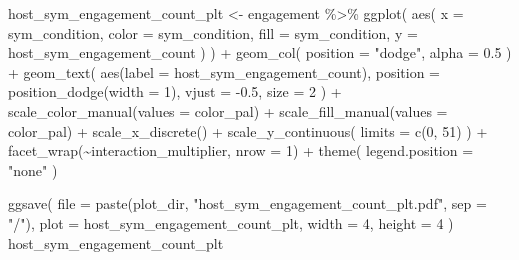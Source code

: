 \documentclass[
]{book}
\newenvironment{Shaded}{\begin{snugshade}}{\end{snugshade}}
\newcommand{\AttributeTok}[1]{\textcolor[rgb]{0.77,0.63,0.00}{#1}}
\newcommand{\DecValTok}[1]{\textcolor[rgb]{0.00,0.00,0.81}{#1}}
\newcommand{\FloatTok}[1]{\textcolor[rgb]{0.00,0.00,0.81}{#1}}
\newcommand{\FunctionTok}[1]{\textcolor[rgb]{0.00,0.00,0.00}{#1}}
\newcommand{\NormalTok}[1]{#1}
\newcommand{\OtherTok}[1]{\textcolor[rgb]{0.56,0.35,0.01}{#1}}
\newcommand{\SpecialCharTok}[1]{\textcolor[rgb]{0.00,0.00,0.00}{#1}}
\newcommand{\StringTok}[1]{\textcolor[rgb]{0.31,0.60,0.02}{#1}}
\begin{document}
\begin{Shaded}
\begin{Highlighting}[]
\NormalTok{host\_sym\_engagement\_count\_plt }\OtherTok{\textless{}{-}}\NormalTok{ engagement }\SpecialCharTok{\%\textgreater{}\%}
  \FunctionTok{ggplot}\NormalTok{(}
    \FunctionTok{aes}\NormalTok{(}
      \AttributeTok{x =}\NormalTok{ sym\_condition,}
      \AttributeTok{color =}\NormalTok{ sym\_condition,}
      \AttributeTok{fill =}\NormalTok{ sym\_condition,}
      \AttributeTok{y =}\NormalTok{ host\_sym\_engagement\_count}
\NormalTok{    )}
\NormalTok{  ) }\SpecialCharTok{+}
  \FunctionTok{geom\_col}\NormalTok{(}
    \AttributeTok{position =} \StringTok{"dodge"}\NormalTok{,}
    \AttributeTok{alpha =} \FloatTok{0.5}
\NormalTok{  ) }\SpecialCharTok{+}
  \FunctionTok{geom\_text}\NormalTok{(}
    \FunctionTok{aes}\NormalTok{(}\AttributeTok{label =}\NormalTok{ host\_sym\_engagement\_count),}
    \AttributeTok{position =} \FunctionTok{position\_dodge}\NormalTok{(}\AttributeTok{width =} \DecValTok{1}\NormalTok{),}
    \AttributeTok{vjust =} \SpecialCharTok{{-}}\FloatTok{0.5}\NormalTok{,}
    \AttributeTok{size =} \DecValTok{2}
\NormalTok{  ) }\SpecialCharTok{+}
  \FunctionTok{scale\_color\_manual}\NormalTok{(}\AttributeTok{values =}\NormalTok{ color\_pal) }\SpecialCharTok{+}
  \FunctionTok{scale\_fill\_manual}\NormalTok{(}\AttributeTok{values =}\NormalTok{ color\_pal) }\SpecialCharTok{+}
  \FunctionTok{scale\_x\_discrete}\NormalTok{() }\SpecialCharTok{+}
  \FunctionTok{scale\_y\_continuous}\NormalTok{(}
    \AttributeTok{limits =} \FunctionTok{c}\NormalTok{(}\DecValTok{0}\NormalTok{, }\DecValTok{51}\NormalTok{)}
\NormalTok{  ) }\SpecialCharTok{+}
  \FunctionTok{facet\_wrap}\NormalTok{(}\SpecialCharTok{\textasciitilde{}}\NormalTok{interaction\_multiplier, }\AttributeTok{nrow =} \DecValTok{1}\NormalTok{) }\SpecialCharTok{+}
  \FunctionTok{theme}\NormalTok{(}
    \AttributeTok{legend.position =} \StringTok{"none"}
\NormalTok{  )}

\FunctionTok{ggsave}\NormalTok{(}
  \AttributeTok{file =} \FunctionTok{paste}\NormalTok{(plot\_dir, }\StringTok{"host\_sym\_engagement\_count\_plt.pdf"}\NormalTok{, }\AttributeTok{sep =} \StringTok{"/"}\NormalTok{),}
  \AttributeTok{plot =}\NormalTok{ host\_sym\_engagement\_count\_plt,}
  \AttributeTok{width =} \DecValTok{4}\NormalTok{,}
  \AttributeTok{height =} \DecValTok{4}
\NormalTok{)}
\NormalTok{host\_sym\_engagement\_count\_plt}
\end{Highlighting}
\end{Shaded}
\end{document}
